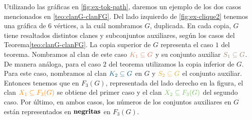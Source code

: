 Utilizando las gr\'aficas en \cref{fig:ex-tok-path}, daremos un ejemplo de los
dos casos mencionados en \cref{teo:clanG-clanFG}. Del lado izquierdo de
\cref{fig:ex-clique2} tenemos una gr\'afica de $6$ v\'ertices, a la cu\'al
nombramos $G$, duplicada. En cada copia, $G$ tiene resaltados distintos clanes y
subconjuntos auxiliares, seg\'un los casos del Teorema\ref{teo:clanG-clanFG}.
La copia superior de $G$ representa el caso $1$ del teorema. Nombramos al clan
de este caso ${\color{salmon}K_1 \subseteq G}$ y su conjunto auxiliar
${\color{baige}S_1\subseteq G}$. De manera an\'aloga, para el caso $2$ del
teorema utilizamos la copia inferior de $G$. Para este caso, nombramos al clan
${\color{azulOscuro}K_2\subseteq G}$ en $G$ y ${\color{oro}S_2\subseteq G}$ el
conjunto auxiliar. Entonces tenemos que en $F_3(G)$, representada del lado
derecho en la figura, el clan ${\color{naranja}X_1\subseteq F_3(G)}$ se obtiene
del primer caso y el clan ${\color{verde}X_2 \subseteq F_3(G)}$ del segundo
caso. Por \'ultimo, en ambos casos, los n\'umeros de los conjuntos auxiliares en
$G$ est\'an representados en ${\bf negritas}$ en $F_3(G)$.

